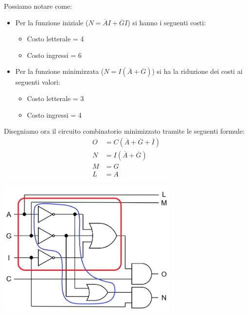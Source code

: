 \begin{questions}
\begin{solution}
            Possiamo notare come:
			\begin{itemize}
				\item Per la funzione iniziale ($N = \overline{A}I + \overline{G}I$) si hanno i seguenti costi:
				\begin{itemize}
					\item Costo letterale = 4
					\item Costo ingressi = 6
				\end{itemize}
				
				\item Per la funzione minimizzata ($N= I(\overline{A} + \overline{G})$) si ha la riduzione dei costi ai seguenti valori:
				\begin{itemize}
					\item Costo letterale = 3
					\item Costo ingressi = 4
				\end{itemize}
			\end{itemize}         
            
            
            Disegniamo ora il circuito combinatorio minimizzato tramite le seguenti formule:
            \begin{align*}
                O &= C(\overline{A} + \overline{G} + \overline{I})\\
				N &= I(\overline{A} + \overline{G})\\
				M &= G \\
				L &= A
            \end{align*}   
            
            \vspace{-2em}
            
            \begin{center}
            	\includegraphics[width=9cm, keepaspectratio]{img/circuito_semi_minimizzato_2.png}
            \end{center}
            

\end{solution}
\end{questions}
